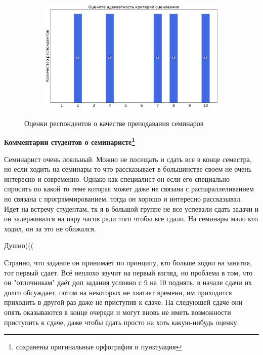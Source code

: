 \begin{figure}[H]
\begin{subfigure}[b]{0.45\textwidth}
            \end{subfigure}
            \begin{subfigure}[b]{0.45\textwidth}
                \centering
                \includegraphics[width=\textwidth]{images/4 course/Введение в распараллеливание алгоритмов и программ/seminarists-marks-Пальян Р.Л.-3.png}
            \end{subfigure}	
            \caption{Оценки респондентов о качестве преподавания семинаров}
        \end{figure}

        \textbf{Комментарии студентов о семинаристе\protect\footnote{сохранены оригинальные орфография и пунктуация}}
            \begin{commentbox} 
                Семинарист очень лояльный. Можно не посещать и сдать все в конце семестра, но если ходить на семинары то что рассказывает в большинстве своем не очень интересно и современно. Однако как специалист он если его специально спросить по какой то теме которая может даже не связана с распараллеливанием но связана с программированием, тогда он хорошо и интересно рассказывал. Идет на встречу студентам, тк я в большой группе не все успевали сдать задачи и он задерживался на пару часов ради того чтобы все сдали. На семинары мало кто ходил, он за это не обижался.  
            \end{commentbox} 
        
            \begin{commentbox} 
                Душно((( 
            \end{commentbox} 
        
            \begin{commentbox} 
                Странно, что задание он принимает по принципу, кто больше ходил на занятия, тот первый сдает. Всё неплохо звучит на первый взгляд, но проблема в том, что он "отличникам" даёт доп задания условно с 9 на 10 поднять, в начале сдачи их долго обсуждает, потом на некоторых не хватает времени, им приходится приходить в другой раз даже не приступив к сдаче. На следующей сдаче они опять оказываются в конце очереди и могут вновь не иметь возможности приступить к сдаче, даже чтобы сдать просто на хоть какую-нибудь оценку. 
            \end{commentbox}
    

